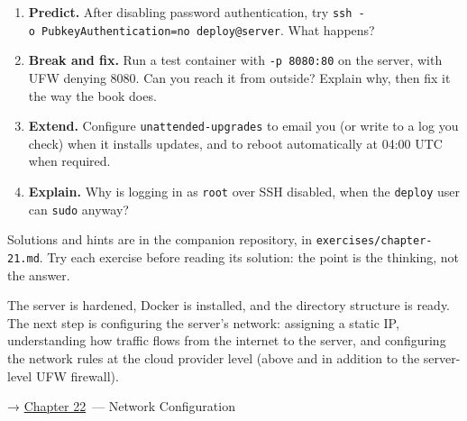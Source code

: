 \label{21-system-setup:exercises}

\begin{enumerate}
\def\labelenumi{\arabic{enumi}.}
\tightlist
\item
  \textbf{Predict.} After disabling password authentication, try \texttt{ssh\ -}\allowbreak{}\texttt{o\ PubkeyAuthentication=}\allowbreak{}\texttt{no\ deploy@server}. What happens?
\item
  \textbf{Break and fix.} Run a test container with \texttt{-p\ 8080:80} on the server, with UFW denying 8080. Can you reach it from outside? Explain why, then fix it the way the book does.
\item
  \textbf{Extend.} Configure \texttt{unattended-upgrades} to email you (or write to a log you check) when it installs updates, and to reboot automatically at 04:00 UTC when required.
\item
  \textbf{Explain.} Why is logging in as \texttt{root} over SSH disabled, when the \texttt{deploy} user can \texttt{sudo} anyway?
\end{enumerate}

\noindent{}Solutions and hints are in the companion repository, in \texttt{exercises/}\allowbreak{}\texttt{chapter-21.md}. Try each exercise before reading its solution: the point is the thinking, not the answer.

\label{21-system-setup:whats-next}

The server is hardened, Docker is installed, and the directory structure is ready. The next step is configuring the server's network: assigning a static IP, understanding how traffic flows from the internet to the server, and configuring the network rules at the cloud provider level (above and in addition to the server-level UFW firewall).

\noindent{}→ \hyperref[ch:22-network-configuration]{Chapter 22}~--- Network Configuration
